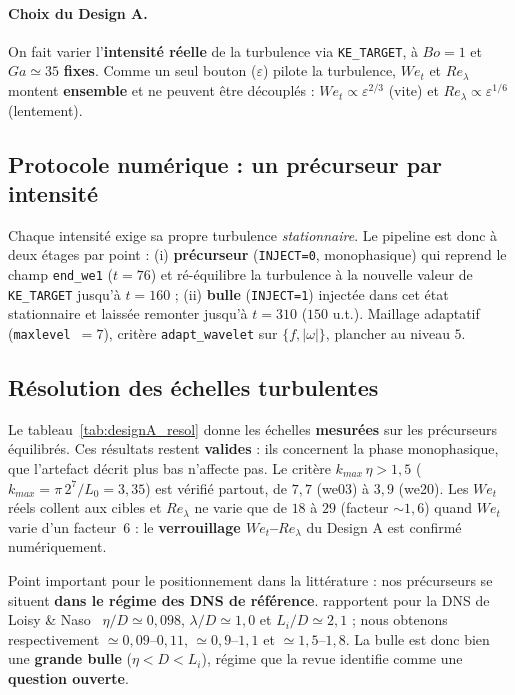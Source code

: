 \paragraph{Choix du Design A.} On fait varier l'\textbf{intensité réelle} de la
turbulence via \texttt{KE\_TARGET}, à $Bo=1$ et $Ga\simeq 35$ \textbf{fixes}. Comme
un seul bouton ($\varepsilon$) pilote la turbulence, $We_t$ et $Re_\lambda$ montent
\textbf{ensemble} et ne peuvent être découplés : $We_t\propto\varepsilon^{2/3}$
(vite) et $Re_\lambda\propto\varepsilon^{1/6}$ (lentement).

\subsection{Protocole numérique : un précurseur par intensité}

Chaque intensité exige sa propre turbulence \emph{stationnaire}. Le pipeline est
donc à deux étages par point : (i) \textbf{précurseur} (\texttt{INJECT=0},
monophasique) qui reprend le champ \texttt{end\_we1} ($t=76$) et ré-équilibre la
turbulence à la nouvelle valeur de \texttt{KE\_TARGET} jusqu'à $t=160$ ;
(ii) \textbf{bulle} (\texttt{INJECT=1}) injectée dans cet état stationnaire et
laissée remonter jusqu'à $t=310$ ($150$ u.t.). Maillage adaptatif
(\texttt{maxlevel}~$=7$), critère \texttt{adapt\_wavelet} sur $\{f, |\omega|\}$,
plancher au niveau $5$.

\subsection{Résolution des échelles turbulentes}

Le tableau~\ref{tab:designA_resol} donne les échelles \textbf{mesurées} sur les
précurseurs équilibrés. Ces résultats restent \textbf{valides} : ils concernent la
phase monophasique, que l'artefact décrit plus bas n'affecte pas. Le critère
$k_{max}\,\eta > 1{,}5$ ($k_{max}=\pi\,2^7/L_0 = 3{,}35$) est vérifié partout, de
$7{,}7$ (we03) à $3{,}9$ (we20). Les $We_t$ réels collent aux cibles et
$Re_\lambda$ ne varie que de $18$ à $29$ (facteur ${\sim}1{,}6$) quand $We_t$ varie
d'un facteur~$6$ : le \textbf{verrouillage $We_t$--$Re_\lambda$} du Design A est
confirmé numériquement.

Point important pour le positionnement dans la littérature : nos précurseurs se
situent \textbf{dans le régime des DNS de référence}. \cite{legendre2025}
rapportent pour la DNS de Loisy \& Naso~\cite{loisy2017} $\eta/D\simeq0{,}098$, $\lambda/D\simeq1{,}0$
et $L_i/D\simeq2{,}1$ ; nous obtenons respectivement ${\simeq}0{,}09$--$0{,}11$,
${\simeq}0{,}9$--$1{,}1$ et ${\simeq}1{,}5$--$1{,}8$. La bulle est donc bien une
\textbf{grande bulle} ($\eta < D < L_i$), régime que la revue identifie comme une
\textbf{question ouverte}.

